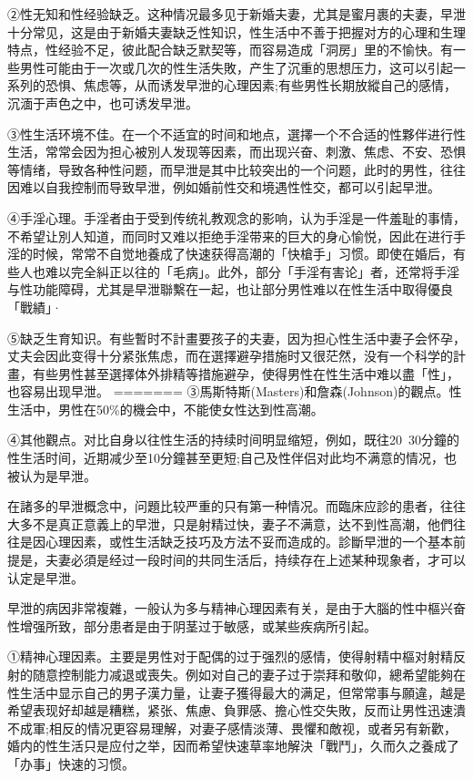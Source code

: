 \documentclass[12pt,UTF8]{ctexbook}
\begin{document}
②性无知和性经验缺乏。这种情况最多见于新婚夫妻，尤其是蜜月裹的夫妻，早泄十分常见，这是由于新婚夫妻缺乏性知识，性生活中不善于把握对方的心理和生理特点，性经验不足，彼此配合缺乏默契等，而容易造成「洞房」里的不愉快。有一些男性可能由于一次或几次的性生活失敗，产生了沉重的思想压力，这可以引起一系列的恐惧、焦虑等，从而诱发早泄的心理因素;有些男性长期放縱自己的感情，沉湎于声色之中，也可诱发早泄。

③性生活环境不佳。在一个不适宜的时间和地点，選擇一个不合适的性夥伴进行性生活，常常会因为担心被別人发现等因素，而出现兴奋、刺激、焦虑、不安、恐惧等情绪，导致各种性问题，而早泄是其中比较突出的一个问题，此时的男性，往往因难以自我控制而导致早泄，例如婚前性交和境遇性性交，都可以引起早泄。

④手淫心理。手淫者由于受到传统礼教观念的影响，认为手淫是一件羞耻的事情，不希望让別人知道，而同时又难以拒绝手淫带来的巨大的身心愉悦，因此在进行手淫的时候，常常不自觉地養成了快速获得高潮的「快槍手」习惯。即使在婚后，有些人也难以完全糾正以往的「毛病」。此外，部分「手淫有害论」者，还常将手淫与性功能障碍，尤其是早泄聯繫在一起，也让部分男性难以在性生活中取得優良「戰績」·

⑤缺乏生育知识。有些暫时不計畫要孩子的夫妻，因为担心性生活中妻子会怀孕，丈夫会因此变得十分紧张焦虑，而在選擇避孕措施时又很茫然，没有一个科学的計畫，有些男性甚至選擇体外排精等措施避孕，使得男性在性生活中难以盡「性」，也容易出现早泄。
=======
③馬斯特斯(Masters)和詹森(Johnson)的觀点。性生活中，男性在50\%的機会中，不能使女性达到性高潮。

④其他觀点。对比自身以往性生活的持续时间明显缩短，例如，既往20~30分鐘的性生活时间，近期减少至10分鐘甚至更短;自己及性伴侣对此均不满意的情况，也被认为是早泄。

在諸多的早泄概念中，问題比较严重的只有第一种情况。而臨床应診的患者，往往大多不是真正意義上的早泄，只是射精过快，妻子不满意，达不到性高潮，他們往往是因心理因素，或性生活缺乏技巧及方法不妥而造成的。診斷早泄的一个基本前提是，夫妻必須是经过一段时间的共同生活后，持续存在上述某种现象者，才可以认定是早泄。

早泄的病因非常複雜，一般认为多与精神心理因素有关，是由于大腦的性中樞兴奋性增强所致，部分患者是由于阴茎过于敏感，或某些疾病所引起。

①精神心理因素。主要是男性对于配偶的过于强烈的感情，使得射精中樞对射精反射的随意控制能力减退或喪失。例如对自己的妻子过于崇拜和敬仰，總希望能夠在性生活中显示自己的男子漢力量，让妻子獲得最大的满足，但常常事与願違，越是希望表现好却越是糟糕，紧张、焦慮、負罪感、擔心性交失敗，反而让男性迅速潰不成軍;相反的情况更容易理解，对妻子感情淡薄、畏懼和敵视，或者另有新歡，婚内的性生活只是应付之举，因而希望快速草率地解決「戰鬥」，久而久之養成了「办事」快速的习惯。
\end{document}
